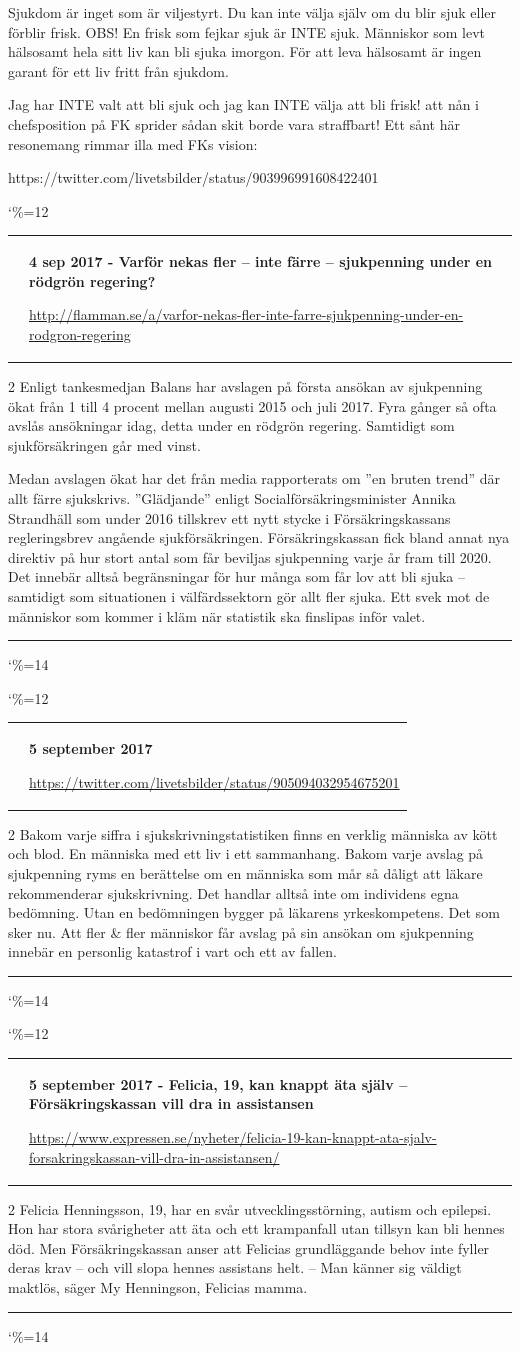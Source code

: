 \documentclass[a4paper]{article}
\makeatletter
\newcommand{\entry}{
\catcode`\%=12
\@entry}
\newcommand{\@entry}[4][]{
\bigskip
\begin{tabular*}{\textwidth}{l m{\textwidth-4cm}}
\qrcode{#4} & \textbf{#2}

\medskip

\url{#4}

\end{tabular*}

\medskip


\begin{multicols}{2}
#3
\end{multicols}

#1

\medskip
\hrule

\catcode`\%=14
}
\makeatother
\begin{document}
{{Sjukdom är inget som är viljestyrt. Du kan inte välja själv om du blir sjuk eller förblir frisk. OBS! En frisk som fejkar sjuk är INTE sjuk.
Människor som levt hälsosamt hela sitt liv kan bli sjuka imorgon. För att leva hälsosamt är ingen garant för ett liv fritt från sjukdom.

Jag har INTE valt att bli sjuk och jag kan INTE välja att bli frisk! att nån i chefsposition på FK sprider sådan skit borde vara straffbart!
Ett sånt här resonemang rimmar illa med FKs vision: }{https://twitter.com/livetsbilder/status/903996991608422401}

\entry{4 sep 2017 - Varför nekas fler – inte färre – sjukpenning under en rödgrön regering?}{Enligt tankesmedjan Balans har avslagen på första ansökan av sjukpenning ökat från 1 till 4 procent mellan augusti 2015 och juli 2017.  Fyra gånger så ofta avslås ansökningar idag, detta under en rödgrön regering. Samtidigt som sjukförsäkringen går med vinst.

Medan avslagen ökat har det från media rapporterats om ”en bruten trend” där allt färre sjukskrivs. ”Glädjande” enligt Socialförsäkringsminister Annika Strandhäll som under 2016 tillskrev ett nytt stycke i Försäkringskassans regleringsbrev angående sjukförsäkringen. Försäkringskassan fick bland annat nya direktiv på hur stort antal som får beviljas sjukpenning varje år fram till 2020. Det innebär alltså begränsningar för hur många som får lov att bli sjuka – samtidigt som situationen i välfärdssektorn gör allt fler sjuka. Ett svek mot de människor som kommer i kläm när statistik ska finslipas inför valet.}{http://flamman.se/a/varfor-nekas-fler-inte-farre-sjukpenning-under-en-rodgron-regering}

\entry{5 september 2017}{Bakom varje siffra i sjukskrivningstatistiken finns en verklig människa av kött och blod. En människa med ett liv i ett sammanhang.
Bakom varje avslag på sjukpenning ryms en berättelse om en människa som mår så dåligt att läkare rekommenderar sjukskrivning.
Det handlar alltså inte om individens egna bedömning. Utan en bedömningen bygger på läkarens yrkeskompetens.
Det som sker nu. Att fler \& fler människor får avslag på sin ansökan om sjukpenning innebär en personlig katastrof i vart och ett av fallen.}{https://twitter.com/livetsbilder/status/905094032954675201}

\entry{5 september 2017 - Felicia, 19, kan knappt äta själv – Försäkringskassan vill dra in assistansen}{Felicia Henningsson, 19, har en svår utvecklingsstörning, autism och epilepsi.
Hon har stora svårigheter att äta och ett krampanfall utan tillsyn kan bli hennes död.
Men Försäkringskassan anser att Felicias grundläggande behov inte fyller deras krav – och vill slopa hennes assistans helt.
– Man känner sig väldigt maktlös, säger My Henningson, Felicias mamma.}{https://www.expressen.se/nyheter/felicia-19-kan-knappt-ata-sjalv-forsakringskassan-vill-dra-in-assistansen/}

}
\end{document}
